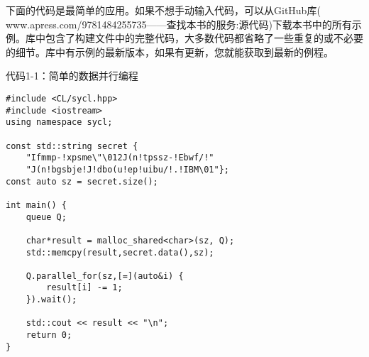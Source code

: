 下面的代码是最简单的应用。如果不想手动输入代码，可以从GitHub库(\\www.apress.com/9781484255735——查找本书的服务:源代码)下载本书中的所有示例。库中包含了构建文件中的完整代码，大多数代码都省略了一些重复的或不必要的细节。库中有示例的最新版本，如果有更新，您就能获取到最新的例程。\par

代码1-1：简单的数据并行编程
\begin{lstlisting}[caption={}]
#include <CL/sycl.hpp>
#include <iostream>
using namespace sycl;

const std::string secret {
	"Ifmmp-!xpsme\"\012J(n!tpssz-!Ebwf/!"
	"J(n!bgsbje!J!dbo(u!ep!uibu/!.!IBM\01"};
const auto sz = secret.size();

int main() {
	queue Q;
	
	char*result = malloc_shared<char>(sz, Q);
	std::memcpy(result,secret.data(),sz);
	
	Q.parallel_for(sz,[=](auto&i) {
		result[i] -= 1;
	}).wait();

	std::cout << result << "\n";
	return 0;
}
\end{lstlisting}